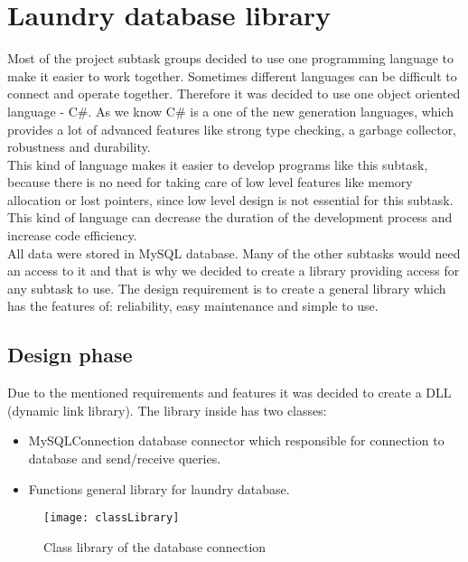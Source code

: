 %
\section{Laundry database library}

Most of the project subtask groups decided to use one programming language to make it easier to work together. Sometimes different languages can be difficult to connect and operate together. Therefore it was decided to use one object oriented language - C\#. As we know C\# is a one of the new generation languages, which provides a lot of advanced features like strong type checking, a garbage collector, robustness and durability. \\ This kind of language makes it easier to develop programs like this subtask, because there is no need for taking care of low level features like memory allocation or lost pointers, since low level design is not essential for this subtask. This kind of language can decrease the duration of the development process and increase code efficiency. \\

All data were stored in MySQL database. Many of the other subtasks would need an access to it and that is why we decided to create a library providing access for any subtask to use. The design requirement is to create a general library which has the features of:  reliability, easy maintenance and simple to use.

\subsection{Design phase}

Due to the mentioned requirements and features it was decided to create a DLL (dynamic link library). The library inside has two classes:

\begin{itemize}
	\item MySQLConnection \textendash database connector which responsible for connection to database and send/receive queries.
	\item Functions \textendash general library for laundry database.
\end{itemize}

\begin{figure}[h]
	\centering
		\texttt{[image: classLibrary]}
	\caption{Class library of the database connection}
	\label{fig:planning}
\end{figure}

